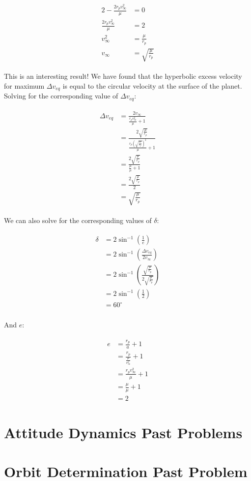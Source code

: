 \documentclass[
]{article}
\let\oldsection\section
\renewcommand\section{\clearpage\oldsection}
\begin{document}
\[\begin{aligned}
\begin{aligned}
    2 - \frac{2r_p v_\infty^2}{\mu} &= 0 \\
    \frac{2r_p v_\infty^2}{\mu} &= 2 \\
    v_\infty^2 &= \frac{\mu}{r_p} \\
    v_\infty &= \sqrt{\frac{\mu}{r_p}}
\end{aligned}
\end{aligned}\]

This is an interesting result! We have found that the hyperbolic excess
velocity for maximum \(\Delta v_{eq}\) is equal to the circular velocity
at the surface of the planet. Solving for the corresponding value of
\(\Delta v_{eq}\):

\[\begin{aligned}
\begin{aligned}
    \Delta v_{eq} &= \frac{2 v_\infty}{\frac{r_p v_\infty^2}{\mu} + 1} \\
    &= \frac{2 \sqrt{\frac{\mu}{r_p}}}{\frac{r_p \left( \sqrt{\frac{\mu}{r_p}} \right)^2}{\mu} + 1} \\
    &= \frac{2 \sqrt{\frac{\mu}{r_p}}}{\frac{\mu}{\mu} + 1} \\
    &= \frac{2 \sqrt{\frac{\mu}{r_p}}}{2} \\
    &= \sqrt{\frac{\mu}{r_p}}
\end{aligned}
\end{aligned}\]

We can also solve for the corresponding values of \(\delta\):

\[\begin{aligned}
\begin{aligned}
    \delta &= 2 \sin^{-1} \left( \frac{1}{e} \right) \\
    &= 2 \sin^{-1} \left( \frac{\Delta v_{eq}}{2 v_\infty} \right) \\
    &= 2 \sin^{-1} \left( \frac{\sqrt{\frac{\mu}{r_p}}}{2 \sqrt{\frac{\mu}{r_p}}} \right) \\
    &= 2 \sin^{-1} \left( \frac{1}{2} \right) \\
    &= 60^\circ \\
\end{aligned}
\end{aligned}\]

And \(e\):

\[\begin{aligned}
\begin{aligned}
    e &= \frac{r_p}{a} + 1 \\
    &= \frac{r_p}{\frac{\mu}{v_\infty^2}} + 1 \\
    &= \frac{r_p v_\infty^2}{\mu} + 1 \\
    &= \frac{\mu}{\mu} + 1 \\
    &= 2
\end{aligned}
\end{aligned}\]

\section{Attitude Dynamics Past
Problems}\label{attitude-dynamics-past-problems}

\section{Orbit Determination Past
Problem}\label{orbit-determination-past-problem}
\end{document}
